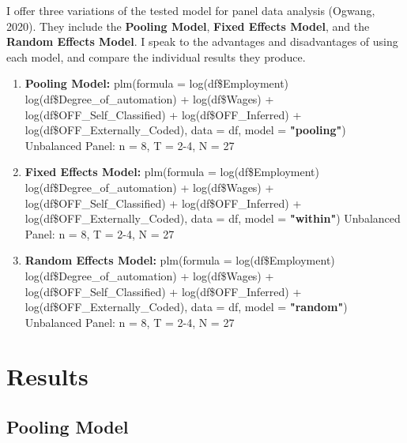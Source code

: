 \documentclass[12pt]{article}
\begin{document}
\begin{flushleft}
I offer three variations of the tested model for panel data analysis (Ogwang, 2020). They include the \textbf{Pooling Model}, \textbf{Fixed Effects Model}, and the \textbf{Random Effects Model}. I speak to the advantages and disadvantages of using each model, and compare the individual results they produce.
\break
\begin{enumerate}
\item \textbf{Pooling Model:}
plm(formula = log(df\$Employment) ~ log(df\$Degree\_of\_automation) + 
    log(df\$Wages) + log(df\$OFF\_Self\_Classified) + log(df\$OFF\_Inferred) + 
    log(df\$OFF\_Externally\_Coded), data = df, model = \textbf{"pooling"})
Unbalanced Panel: n = 8, T = 2-4, N = 27
\item \textbf{Fixed Effects Model:}
plm(formula = log(df\$Employment) ~ log(df\$Degree\_of\_automation) + 
    log(df\$Wages) + log(df\$OFF\_Self\_Classified) + log(df\$OFF\_Inferred) + 
    log(df\$OFF\_Externally\_Coded), data = df, model = \textbf{"within"})
Unbalanced Panel: n = 8, T = 2-4, N = 27
\item \textbf{Random Effects Model:}
plm(formula = log(df\$Employment) ~ log(df\$Degree\_of\_automation) + 
    log(df\$Wages) + log(df\$OFF\_Self\_Classified) + log(df\$OFF\_Inferred) + 
    log(df\$OFF\_Externally\_Coded), data = df, model = \textbf{"random"})
Unbalanced Panel: n = 8, T = 2-4, N = 27
\end{enumerate}
\end{flushleft}

\newpage

\section{Results}

\subsection{Pooling Model}
\end{document}
